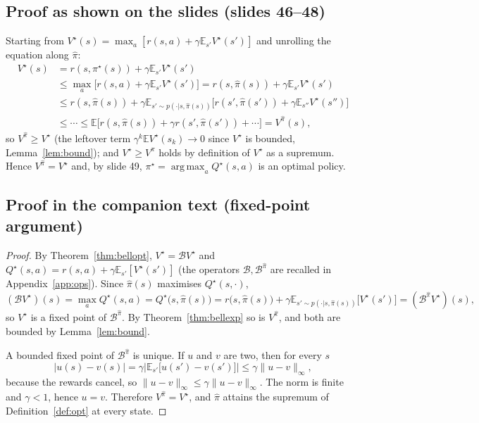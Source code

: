 \documentclass[11pt,a4paper]{article}
\newcommand{\E}{\mathbb{E}}
\DeclareMathOperator*{\argmax}{arg\,max}
\theoremstyle{plain}
\theoremstyle{definition}
\theoremstyle{remark}
\begin{document}
\subsection*{Proof as shown on the slides (slides 46--48)}
Starting from $V^\star(s)=\max_a[r(s,a)+\gamma\E_{s'}V^\star(s')]$ and unrolling the equation along $\hat\pi$:
\begin{align*}
V^\star(s)&=r(s,\pi^\star(s))+\gamma\E_{s'}V^\star(s')\\
&\le\max_a\Big[r(s,a)+\gamma\E_{s'}V^\star(s')\Big]=r(s,\hat\pi(s))+\gamma\E_{s'}V^\star(s')\\
&\le r(s,\hat\pi(s))+\gamma\E_{s'\sim p(\cdot|s,\hat\pi(s))}\Big[r(s',\hat\pi(s'))+\gamma\E_{s''}V^\star(s'')\Big]\\
&\le\cdots\le\E\Big[r(s,\hat\pi(s))+\gamma r(s',\hat\pi(s'))+\cdots\Big]=V^{\hat\pi}(s),
\end{align*}
so $V^{\hat\pi}\ge V^\star$ (the leftover term $\gamma^k\E V^\star(s_k)\to0$ since $V^\star$ is bounded, Lemma~\ref{lem:bound}); and $V^\star\ge V^{\hat\pi}$ holds by definition of $V^\star$ as a supremum. Hence $V^{\hat\pi}=V^\star$ and, by slide 49, $\pi^\star=\argmax_aQ^\star(s,a)$ is an optimal policy.

\subsection*{Proof in the companion text (fixed-point argument)}
\begin{proof}
By Theorem~\ref{thm:bellopt}, $V^\star=\mathcal BV^\star$ and $Q^\star(s,a)=r(s,a)+\gamma\E_{s'}[V^\star(s')]$ (the operators $\mathcal B,\mathcal B^{\hat\pi}$ are recalled in Appendix~\ref{app:ops}). Since $\hat\pi(s)$ maximises $Q^\star(s,\cdot)$,
\[
(\mathcal BV^\star)(s)=\max_aQ^\star(s,a)=Q^\star\big(s,\hat\pi(s)\big)=r\big(s,\hat\pi(s)\big)+\gamma\E_{s'\sim p(\cdot|s,\hat\pi(s))}\big[V^\star(s')\big]=(\mathcal B^{\hat\pi}V^\star)(s),
\]
so $V^\star$ is a fixed point of $\mathcal B^{\hat\pi}$. By Theorem~\ref{thm:bellexp} so is $V^{\hat\pi}$, and both are bounded by Lemma~\ref{lem:bound}.

A bounded fixed point of $\mathcal B^{\hat\pi}$ is unique. If $u$ and $v$ are two, then for every $s$
\[
|u(s)-v(s)|=\gamma\Big|\E_{s'}\big[u(s')-v(s')\big]\Big|\le\gamma\|u-v\|_\infty,
\]
because the rewards cancel, so $\|u-v\|_\infty\le\gamma\|u-v\|_\infty$. The norm is finite and $\gamma<1$, hence $u=v$. Therefore $V^{\hat\pi}=V^\star$, and $\hat\pi$ attains the supremum of Definition~\ref{def:opt} at every state.
\end{proof}
\end{document}
